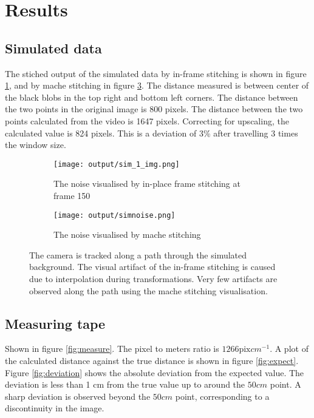 \section{Results}

\subsection{Simulated data}

The stiched output of the simulated data by in-frame stitching is shown in figure \ref{fig:simnoise_a},
and by mache stitching in figure \ref{fig:simnoise}.
The distance measured is between center of the black blobs in the top right and bottom left corners.
The distance between the two points in the original image is 800 pixels.
The distance between the two points calculated from the video is 1647 pixels.
Correcting for upscaling, the calculated value is 824 pixels.
This is a deviation of 3\% after travelling 3 times the window size.

\begin{figure}
  \begin{subfigure}[b]{0.45\textwidth}
    \texttt{[image: output/sim\_1\_img.png]}
    \caption{The noise visualised by in-place frame stitching at frame 150}
    \label{fig:simnoise_a}
  \end{subfigure}
  \begin{subfigure}[b]{0.45\textwidth}
    \texttt{[image: output/simnoise.png]}
    \caption{The noise visualised by mache stitching}
    \label{fig:simnoise}
  \end{subfigure}
  \caption{The camera is tracked along a path through the simulated background.
  The visual artifact of the in-frame stitching is caused due to interpolation during transformations.
  Very few artifacts are observed along the path using the mache stitching visualisation.}
\end{figure}

\subsection{Measuring tape}

Shown in figure \ref{fig:measure}.
The pixel to meters ratio is $1266 \text{pix} cm^{-1}$.
A plot of the calculated distance against the true distance is shown in figure \ref{fig:expect}.
Figure \ref{fig:deviation} shows the absolute deviation from the expected value.
The deviation is less than 1 cm from the true value up to around the $50 cm$ point.
A sharp deviation is observed beyond the $50 cm$ point,
corresponding to a discontinuity in the image.

